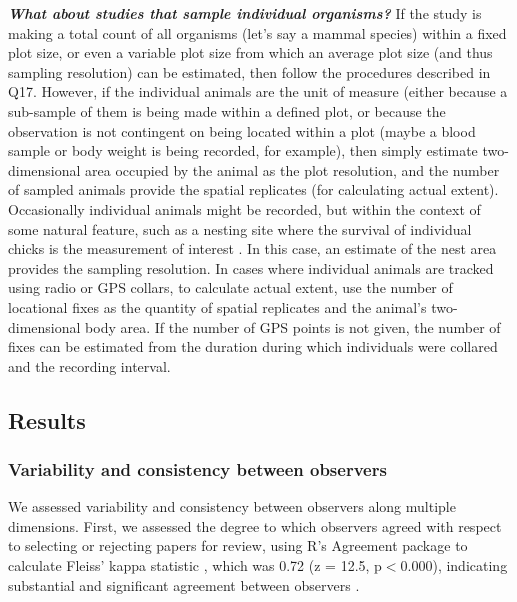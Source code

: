 \documentclass[12pt]{article}
\begin{document}
\begin{enumerate}
  \Hitem \emph{\textbf{What about studies that sample individual organisms?}} If the study is making a total count of all organisms (let's say a mammal species) within a fixed plot size, or even a variable plot size from which an average plot size (and thus sampling resolution) can be estimated, then follow the procedures described in Q17. However, if the individual animals are the unit of measure (either because a sub-sample of them is being made within a defined plot, or because the observation is not contingent on being located within a plot (maybe a blood sample or body weight is being recorded, for example), then simply estimate two-dimensional area occupied by the animal as the plot resolution, and the number of sampled animals provide the spatial replicates (for calculating actual extent). Occasionally individual animals might be recorded, but within the context of some natural feature, such as a nesting site where the survival of individual chicks is the measurement of interest \cite{roche_relative_2008}. In this case, an estimate of the nest area provides the sampling resolution. In cases where individual animals are tracked using radio or GPS collars, to calculate actual extent, use the number of locational fixes as the quantity of spatial replicates and the animal's two-dimensional body area. If the number of GPS points is not given, the number of fixes can be estimated from the duration during which individuals were collared and the recording interval.
\end{enumerate}

\subsection*{Results}
\vspace{-4pt}

\subsubsection*{Variability and consistency between observers}
\vspace{-10pt}

We assessed variability and consistency between observers along multiple dimensions. First, we assessed the degree to which observers agreed with respect to selecting or rejecting papers for review, using R's Agreement package \cite{yu_agreement:_2012} to calculate Fleiss' kappa statistic \cite{fleiss_measuring_1971}, which was 0.72 (z = 12.5, p$<$0.000), indicating substantial and significant agreement between observers \cite{landis_measurement_1977}. 
\end{document}
